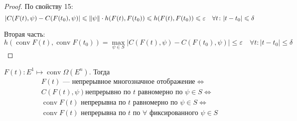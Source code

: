 \begin{proof}
    По свойству 15:
    \begin{equation*}
        |C(F(t), \psi) - C(F(t_0), \psi)| \leqslant \lVert \psi \rVert \cdot h(F(t), F(t_0)) \leqslant h(F(t), F(t_0)) \leqslant \varepsilon \quad \forall t\colon |t - t_0| \leqslant \delta
    \end{equation*}


    Вторая часть:
    \begin{equation*}
        h(\operatorname{conv}F(t), \operatorname{conv}F(t_0)) = \max\limits_{\psi \in S}|C(F(t), \psi) - C(F(t_0), \psi)| \leqslant \varepsilon \quad \forall t\colon |t - t_0| \leqslant \delta
    \end{equation*}
\end{proof}

\begin{crlr}
    $F(t)\colon E^1 \mapsto \operatorname{conv}\Omega(E^n)$.
    Тогда 
    \begin{multline*}
        F(t) \text{~--- непрерывное многозначное отображение} \iff \\
        C(F(t), \psi) \text{непрерывно по } t \text{ равномерно по } \psi \in S \iff \\
        \operatorname{conv} F(t) \text{ непрерывна по } t \text{ равномерно по } \psi \in S \iff \\
        \operatorname{conv} F(t) \text{ непрерывна по } t \text{ по } \forall \text{ фиксированного }\psi \in S
    \end{multline*}
\end{crlr}

